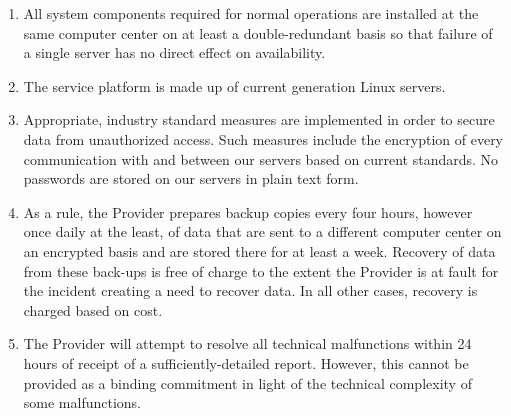 \documentclass{terms}
\begin{document}
\begin{enumerate}
\item All system components required for normal operations are installed at the same computer center on at least a double-redundant basis so that failure of a single server has no direct effect on availability.
\item The service platform is made up of current generation Linux servers.
\item Appropriate, industry standard measures are implemented in order to secure data from unauthorized access. Such measures include the encryption of every communication with and between our servers based on current standards. No passwords are stored on our servers in plain text form.
\item As a rule, the Provider prepares backup copies every four hours, however once daily at the least, of data that are sent to a different computer center on an encrypted basis and are stored there for at least a week. Recovery of data from these back-ups is free of charge to the extent the Provider is at fault for the incident creating a need to recover data. In all other cases, recovery is charged based on cost.
\item The Provider will attempt to resolve all technical malfunctions within 24 hours of receipt of a sufficiently-detailed report. However, this cannot be provided as a binding commitment in light of the technical complexity of some malfunctions.
\end{enumerate}
\end{document}
